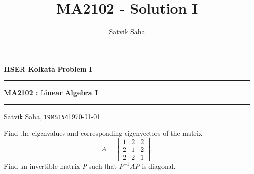 \documentclass[10pt]{article}
\title{MA2102 - Solution I}
\author{Satvik Saha}
\date{}
\begin{document}
        \par\textbf{IISER Kolkata} \hfill \textbf{Problem I}
        \vspace{3pt}
        \hrule
        \vspace{3pt}
        \begin{center}
                \LARGE{\textbf{MA2102 : Linear Algebra I}}
        \end{center}
        \vspace{3pt}
        \hrule
        \vspace{3pt}
        Satvik Saha, \texttt{19MS154}\hfill\today
        \vspace{20pt}

        Find the eigenvalues and corresponding eigenvectors of the matrix
        \[
                A = \begin{bmatrix}
                        1 & 2 & 2 \\ 2 & 1 & 2 \\ 2 & 2 & 1
                \end{bmatrix}.
        \]
        Find an invertible matrix $P$ such that $P^{-1}AP$ is diagonal. \\
\end{document}
